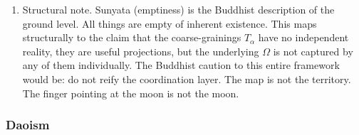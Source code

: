 \documentclass[
]{article}
\begin{document}
\begin{enumerate}
  not to stop the river but to stop grasping at the water. Meditation
  practice trains this directly, sitting with arising and passing of
  sensations, thoughts, emotions without grasping or aversion.
\item
  Structural note. Sunyata (emptiness) is the Buddhist description of
  the ground level. All things are empty of inherent existence. This
  maps structurally to the claim that the coarse-grainings \(T_\alpha\)
  have no independent reality, they are useful projections, but the
  underlying \(\Omega\) is not captured by any of them individually. The
  Buddhist caution to this entire framework would be: do not reify the
  coordination layer. The map is not the territory. The finger pointing
  at the moon is not the moon.
\end{enumerate}

\subsubsection{Daoism}\label{daoism}
\end{document}
